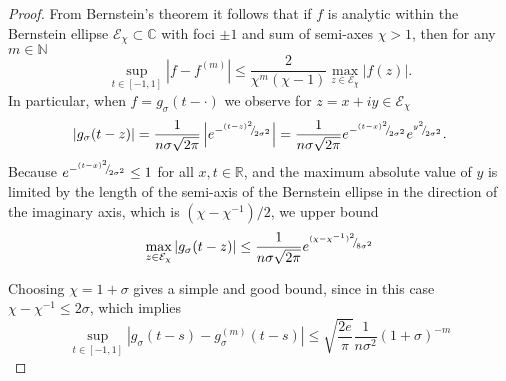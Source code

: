 \documentclass[12pt]{article}
\begin{document}
\begin{proof}
    From Bernstein's theorem \cite[Theorem 4.3]{trefethen-2008-gauss-quadrature} it follows that if $f$ is analytic within the Bernstein ellipse $\mathcal{E}_{\chi} \subset \mathbb{C}$ with foci $\pm 1$ and sum of semi-axes $\chi > 1$, then for any $m \in \mathbb{N}$
    \begin{equation}
        \sup_{t \in [-1, 1]} \left| f - f^{(m)} \right| \leq \frac{2}{\chi^m (\chi - 1)} \max_{z \in \mathcal{E}_{\chi}} |f(z)|.
        \label{equ:bernstein-bound}
    \end{equation}
    In particular, when $f = g_{\sigma}(t - \cdot)$ we observe for $z = x + iy \in \mathcal{E}_{\chi}$
    \begin{equation}
    | g_{\sigma}(t - z) | 
    = \frac{1}{n \sigma \sqrt{2 \pi}} \left| e^{-{}^{(t - z)^2}{\mskip -5mu/\mskip -3mu}_{2\sigma^2}} \right|
    = \frac{1}{n \sigma \sqrt{2 \pi}} e^{-{}^{(t - x)^2}{\mskip -5mu/\mskip -3mu}_{2\sigma^2}}e^{{}^{y^2}{\mskip -5mu/\mskip -3mu}_{2\sigma^2}}.
    \end{equation}
    Because $e^{-{}^{(t - x)^2}{\mskip -5mu/\mskip -3mu}_{2\sigma^2}} \leq 1$ for all $x, t \in \mathbb{R}$, and the maximum absolute value of $y$ is limited by the length of the semi-axis of the Bernstein ellipse in the direction of the imaginary axis, which is $(\chi - \chi^{-1}) / 2$, we upper bound
    \begin{equation}
        \max_{z \in \mathcal{E}_{\chi}} | g_{\sigma}(t - z) | 
        \leq \frac{1}{n \sigma \sqrt{2 \pi}} e^{{}^{(\chi - \chi^{-1})^2}{\mskip -5mu/\mskip -3mu}_{8 \sigma^2}} 
    \end{equation}

    Choosing $\chi = 1 + \sigma$ gives a simple and good bound, since in this case $\chi - \chi^{-1} \leq 2\sigma$, which implies
    \begin{equation}
        \sup_{t \in [-1, 1]} \left| g_{\sigma}(t - s) - g_{\sigma}^{(m)}(t - s) \right| \leq \sqrt{\frac{2e}{\pi}} \frac{1}{n \sigma^2} (1 + \sigma)^{-m}
    \end{equation}
\end{proof}

\end{document}
